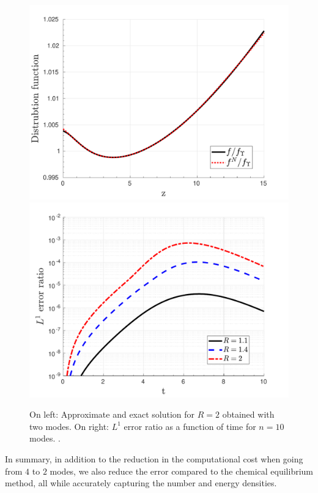 \begin{figure}
\centerline{\includegraphics[width=0.5\linewidth]{plots/keq_approx_T_r_2.pdf}\hspace*{-0.5cm}
\includegraphics[width=0.5\linewidth]{plots/keq_L1_err_time.pdf}}
\caption{On left: Approximate and exact solution for $R=2$ obtained with two modes. On right: $L^1$ error ratio as a function of time for $n=10$ modes.  .}\label{fig:keqApproxTr2}
\end{figure}


In summary, in addition to the reduction in the computational cost when going from $4$ to $2$ modes, we also reduce the error compared to the chemical equilibrium method, all while accurately capturing the number and energy densities. 

